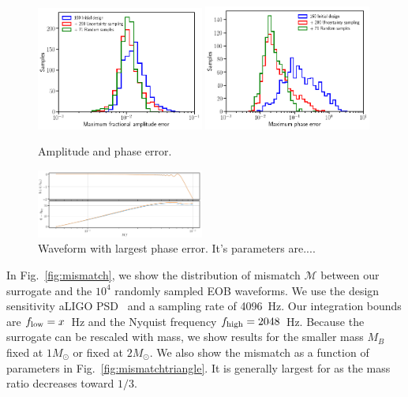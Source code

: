 \documentclass[prd,aps,letter,twocolumn,floatfix,notitlepage]{revtex4-1}
\begin{document}
\begin{figure}[htb]
\centering
\includegraphics[width=0.49\textwidth]{maxamphist.png}
\includegraphics[width=0.49\textwidth]{maxphasehist.png}
\caption{Amplitude and phase error.}
\label{fig:phaserange}
\end{figure}

\begin{figure}[htb]
\centering
\includegraphics[width=0.49\textwidth]{dhmaxerror.png}
\caption{Waveform with largest phase error. It's parameters are....}
\label{fig:phaserange}
\end{figure}


In Fig.~\ref{fig:mismatch}, we show the distribution of mismatch $\mathcal{M}$ between our surrogate
and the $10^4$ randomly sampled EOB waveforms. We use the design sensitivity aLIGO PSD~\cite{Aasi:2013wya} and
a sampling rate of 4096~Hz. Our integration bounds are $f_{\rm low} = x$~Hz and the Nyquist frequency
$f_{\rm high} = 2048$~Hz. Because the surrogate can be rescaled with mass,
we show results for the smaller mass $M_B$ fixed at $1M_\odot$ or fixed at $2M_\odot$.
We also show the mismatch as a function of parameters in Fig.~\ref{fig:mismatchtriangle}.
It is generally largest for as the mass ratio decreases toward $1/3$.
\end{document}
